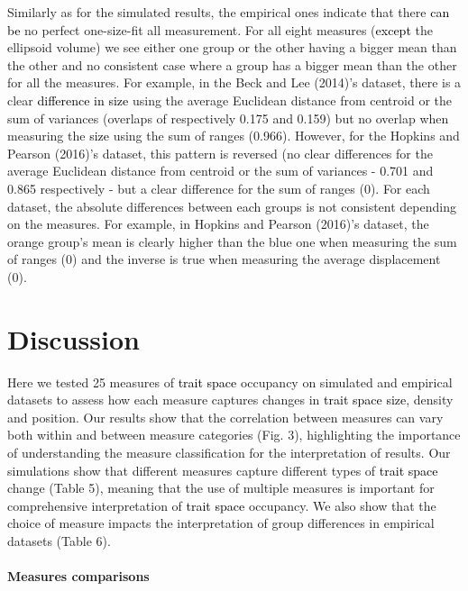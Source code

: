 \documentclass[]{article}
\let\oldparagraph\paragraph
\renewcommand{\paragraph}[1]{\oldparagraph{#1}\mbox{}}
\begin{document}
\renewcommand\baselinestretch{1.6}\selectfont

Similarly as for the simulated results, the empirical ones indicate that
there \textcolor{black}{can be} no perfect one-size-fit all
measurement. For all eight measures
(\textcolor{black}{except} the ellipsoid volume) we see
either one group or the other having a bigger mean than the other and no
consistent case where a group has a bigger mean than the other for all
the measures. For example, in the Beck and Lee (2014)'s dataset, there
is a clear \textcolor{black}{difference in size} using the
average Euclidean distance from centroid or the sum of variances
(overlaps of respectively 0.175 and 0.159) but no overlap when measuring
the \textcolor{black}{size} using the sum of ranges (0.966).
However, for the Hopkins and Pearson (2016)'s dataset, this pattern is
reversed (no clear differences for the average Euclidean distance from
centroid or the sum of variances - 0.701 and 0.865 respectively - but a
clear difference for the sum of ranges (0). For each dataset, the
absolute differences between each groups is not consistent depending on
the measures. For example, in Hopkins and Pearson (2016)'s dataset, the
orange group's mean is clearly higher than the blue one when measuring
the sum of ranges (0) and the inverse is true when measuring the average
displacement (0).

\section{Discussion}\label{discussion}

Here we tested 25 measures of \textcolor{black}{trait space}
occupancy on simulated and empirical datasets to assess how each measure
captures changes in \textcolor{black}{trait space size},
density and position. Our results show that the correlation between
measures can vary both within and between measure categories (Fig. 3),
highlighting the importance of understanding the measure classification
for the interpretation of results. Our simulations show that different
measures capture different types of
\textcolor{black}{trait space} change (Table 5), meaning that
the use of multiple measures is important for comprehensive
interpretation of \textcolor{black}{trait space} occupancy.
We also show that the choice of measure impacts the interpretation of
group differences in empirical datasets (Table 6).

\paragraph{Measures comparisons}\label{measures-comparisons}
\end{document}
